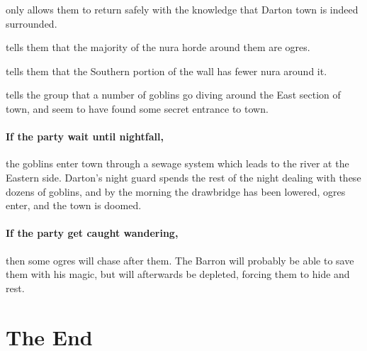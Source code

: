 \begin{multicols}{2}
\setcounter{list}{-1}
\begin{list}{\addtocounter{list}{1}\textbf{Margin }:}{\raggedleft}

  \item{only allows them to return safely with the knowledge that Darton town is indeed surrounded.}
  \item{tells them that the majority of the nura horde around them are ogres.}
  \item{tells them that the Southern portion of the wall has fewer nura around it.}
  \item{tells the group that a number of goblins go diving around the East section of town, and seem to have found some secret entrance to town.}
\end{list}

\paragraph{If the party wait until nightfall,}
the goblins enter town through a sewage system which leads to the river at the Eastern side.
Darton's night guard spends the rest of the night dealing with these dozens of goblins, and by the morning the drawbridge has been lowered, ogres enter, and the town is doomed.

\paragraph{If the party get caught wandering,}
then some ogres will chase after them.
The Barron will probably be able to save them with his magic, but will afterwards be depleted, forcing them to hide and rest.

\ogre

\end{multicols}

\section{The End}

